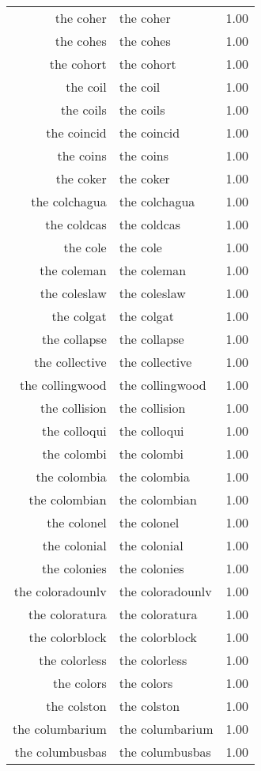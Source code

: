\begin{table}[ht]
\begin{tabular}{rlr}
  the coher & the coher & 1.00 \\ 
  the cohes & the cohes & 1.00 \\ 
  the cohort & the cohort & 1.00 \\ 
  the coil & the coil & 1.00 \\ 
  the coils & the coils & 1.00 \\ 
  the coincid & the coincid & 1.00 \\ 
  the coins & the coins & 1.00 \\ 
  the coker & the coker & 1.00 \\ 
  the colchagua & the colchagua & 1.00 \\ 
  the coldcas & the coldcas & 1.00 \\ 
  the cole & the cole & 1.00 \\ 
  the coleman & the coleman & 1.00 \\ 
  the coleslaw & the coleslaw & 1.00 \\ 
  the colgat & the colgat & 1.00 \\ 
  the collapse & the collapse & 1.00 \\ 
  the collective & the collective & 1.00 \\ 
  the collingwood & the collingwood & 1.00 \\ 
  the collision & the collision & 1.00 \\ 
  the colloqui & the colloqui & 1.00 \\ 
  the colombi & the colombi & 1.00 \\ 
  the colombia & the colombia & 1.00 \\ 
  the colombian & the colombian & 1.00 \\ 
  the colonel & the colonel & 1.00 \\ 
  the colonial & the colonial & 1.00 \\ 
  the colonies & the colonies & 1.00 \\ 
  the coloradounlv & the coloradounlv & 1.00 \\ 
  the coloratura & the coloratura & 1.00 \\ 
  the colorblock & the colorblock & 1.00 \\ 
  the colorless & the colorless & 1.00 \\ 
  the colors & the colors & 1.00 \\ 
  the colston & the colston & 1.00 \\ 
  the columbarium & the columbarium & 1.00 \\ 
  the columbusbas & the columbusbas & 1.00 \\ 

\end{tabular}
\end{table}
